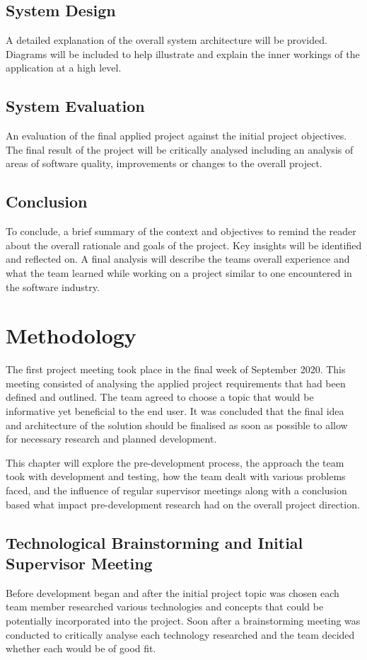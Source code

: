 \section{System Design}
A detailed explanation of the overall system architecture will be provided. Diagrams will be included to help illustrate and explain the inner workings of the application at a high level.

\section{System Evaluation}
An evaluation of the final applied project against the initial project objectives. The final result of the project will be critically analysed including an analysis of areas of software quality, improvements or changes to the overall project.

\section{Conclusion}
To conclude, a brief summary of the context and objectives to remind the reader about the overall rationale and goals of the project. Key insights will be identified and reflected on. A final analysis will describe the teams overall experience and what the team learned while working on a project similar to one encountered in the software industry. 


\chapter{Methodology}
The first project meeting took place in the final week of September 2020. This meeting consisted of analysing the applied project requirements that had been defined and outlined. The team agreed to choose a topic that would be informative yet beneficial to the end user. It was concluded that the final idea and architecture of the solution should be finalised as soon as possible to allow for necessary research and planned development.

\vspace{5mm} %

This chapter will explore the pre-development process, the approach the team took with development and testing, how the team dealt with various problems faced, and the influence of regular supervisor meetings along with a conclusion based what impact pre-development research had on the overall project direction. 

\section{Technological Brainstorming and Initial Supervisor Meeting}
Before development began and after the initial project topic was chosen each team member researched various technologies and concepts that could be potentially incorporated into the project. Soon after a brainstorming meeting was conducted to critically analyse each technology researched and the team decided whether each would be of good fit.

